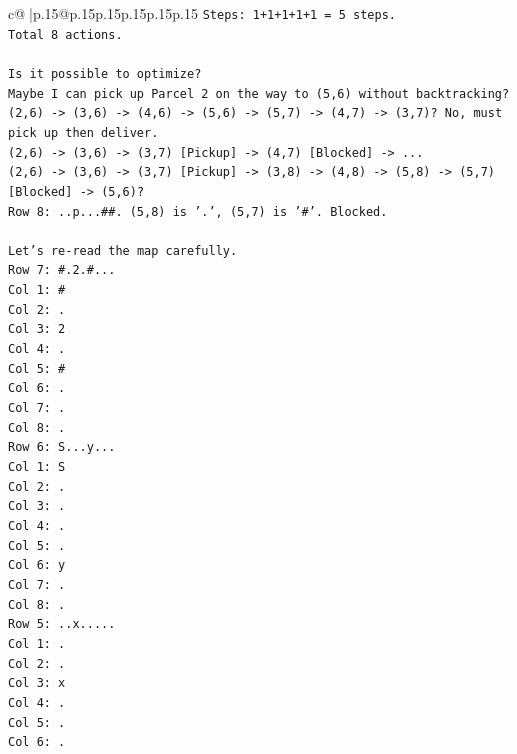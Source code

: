 \documentclass{article}
\begin{document}
{\begin{supertabular}{c@{$\;$}|p{.15\linewidth}@{}p{.15\linewidth}p{.15\linewidth}p{.15\linewidth}p{.15\linewidth}p{.15\linewidth}}
{{{\texttt{Steps: 1+1+1+1+1 = 5 steps.} \\
\texttt{Total 8 actions.} \\
\\ 
\texttt{Is it possible to optimize?} \\
\texttt{Maybe I can pick up Parcel 2 on the way to (5,6) without backtracking?} \\
\texttt{(2,6) {-}> (3,6) {-}> (4,6) {-}> (5,6) {-}> (5,7) {-}> (4,7) {-}> (3,7)? No, must pick up then deliver.} \\
\texttt{(2,6) {-}> (3,6) {-}> (3,7) {[}Pickup{]} {-}> (4,7) {[}Blocked{]} {-}> ...} \\
\texttt{(2,6) {-}> (3,6) {-}> (3,7) {[}Pickup{]} {-}> (3,8) {-}> (4,8) {-}> (5,8) {-}> (5,7) {[}Blocked{]} {-}> (5,6)?} \\
\texttt{Row 8: ..p...\#\#. (5,8) is '.', (5,7) is '\#'. Blocked.} \\
\\ 
\texttt{Let's re{-}read the map carefully.} \\
\texttt{Row 7: \#.2.\#...} \\
\texttt{Col 1: \#} \\
\texttt{Col 2: .} \\
\texttt{Col 3: 2} \\
\texttt{Col 4: .} \\
\texttt{Col 5: \#} \\
\texttt{Col 6: .} \\
\texttt{Col 7: .} \\
\texttt{Col 8: .} \\
\texttt{Row 6: S...y...} \\
\texttt{Col 1: S} \\
\texttt{Col 2: .} \\
\texttt{Col 3: .} \\
\texttt{Col 4: .} \\
\texttt{Col 5: .} \\
\texttt{Col 6: y} \\
\texttt{Col 7: .} \\
\texttt{Col 8: .} \\
\texttt{Row 5: ..x.....} \\
\texttt{Col 1: .} \\
\texttt{Col 2: .} \\
\texttt{Col 3: x} \\
\texttt{Col 4: .} \\
\texttt{Col 5: .} \\
\texttt{Col 6: .} \\
}}}
\end{supertabular}}
\end{document}
